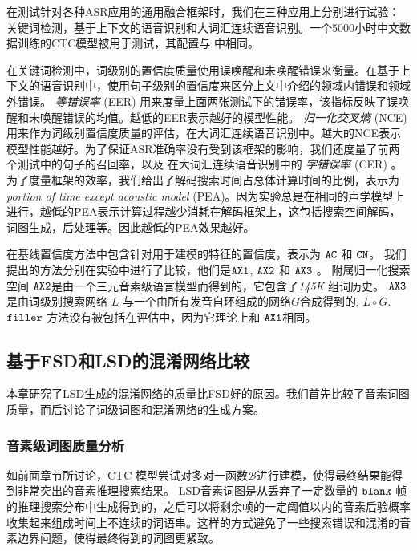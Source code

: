 
在测试针对各种ASR应用的通用融合框架时，我们在三种应用上分别进行试验：关键词检测，基于上下文的语音识别和大词汇连续语音识别。一个5000小时中文数据训练的CTC模型被用于测试，其配置与 \cite{Chen+2016}中相同。

在关键词检测中，词级别的置信度质量使用误唤醒和未唤醒错误来衡量。在基于上下文的语音识别中，使用句子级别的置信度来区分上文中介绍的领域内错误和领域外错误。
 {\em 等错误率} (EER) 用来度量上面两张测试下的错误率，该指标反映了误唤醒和未唤醒错误的均值。越低的EER表示越好的模型性能。
 {\em 归一化交叉熵 } (NCE) \cite{zhc00-chen-icassp2017} 用来作为词级别置信度质量的评估，在大词汇连续语音识别中。越大的NCE表示模型性能越好。为了保证ASR准确率没有受到该框架的影响，我们还度量了前两个测试中的句子的召回率，以及 在大词汇连续语音识别中的 {\em 字错误率} (CER) 。 
 为了度量框架的效率，我们给出了解码搜索时间占总体计算时间的比例，表示为 {\em portion of time except acoustic model} (PEA)。因为实验总是在相同的声学模型上进行，越低的PEA表示计算过程越少消耗在解码框架上，这包括搜索空间解码，词图生成，后处理等。因此越低的PEA效果越好。

 在基线置信度方法中包含针对用于建模的特征的置信度，表示为 $\tt AC $ 和 $ \tt CN $。 我们提出的方法分别在实验中进行了比较，他们是$\tt AX1 $, $\tt AX2 $ 和 $\tt AX3 $ 。 
 附属归一化搜索空间 $\tt AX2 $是由一个三元音素级语言模型而得到的，它包含了{\em 145K} 组词历史。 $\tt AX3 $ 是由词级别搜索网络 $L$ 与一个由所有发音自环组成的网络$G$合成得到的,  $L \circ G$. $\tt filler$ 方法没有被包括在评估中，因为它理论上和 $\tt AX1$相同。

\subsection{基于FSD和LSD的混淆网络比较}
\label{sec:exp-lattice-ana}

本章研究了LSD生成的混淆网络的质量比FSD好的原因。我们首先比较了音素词图质量，而后讨论了词级词图和混淆网络的生成方案。


\subsubsection{音素级词图质量分析}

如前面章节所讨论，CTC 模型尝试对多对一函数$\mathcal{B}$进行建模，使得最终结果能得到非常突出的音素推理搜索结果。
LSD音素词图是从丢弃了一定数量的 $\tt blank$ 帧的推理搜索分布中生成得到的，之后可以将剩余帧的一定阈值以内的音素后验概率收集起来组成时间上不连续的词语串。这样的方式避免了一些搜索错误和混淆的音素边界问题，使得最终得到的词图更紧致。

